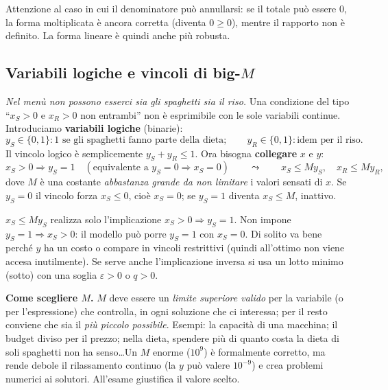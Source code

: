 \begin{oss}
Attenzione al caso in cui il denominatore può annullarsi: se il totale può essere 0, la forma moltiplicata è ancora corretta (diventa $0\ge0$), mentre il rapporto non è definito. La forma lineare è quindi anche più robusta.
\end{oss}

\subsection{Variabili logiche e vincoli di big-\texorpdfstring{$M$}{M}}\label{sec:bigM}

\emph{Nel menù non possono esserci sia gli spaghetti sia il riso.} Una condizione del tipo ``$x_S>0$ e $x_R>0$ non entrambi'' non è esprimibile con le sole variabili continue. Introduciamo \textbf{variabili logiche} (binarie):
\[ y_S\in\{0,1\}: 1 \text{ se gli spaghetti fanno parte della dieta};\qquad y_R\in\{0,1\}: \text{idem per il riso.}\]
Il vincolo logico è semplicemente $y_S+y_R\le 1$. Ora bisogna \textbf{collegare} $x$ e $y$:
\[ x_S>0\Rightarrow y_S=1\quad(\text{equivalente a } y_S=0\Rightarrow x_S=0)\qquad\leadsto\qquad x_S\le M y_S,\quad x_R\le M y_R, \]
dove $M$ è una costante \emph{abbastanza grande da non limitare} i valori sensati di $x$. Se $y_S=0$ il vincolo forza $x_S\le0$, cioè $x_S=0$; se $y_S=1$ diventa $x_S\le M$, inattivo.

\begin{oss}
$x_S\le My_S$ realizza solo l'implicazione $x_S>0\Rightarrow y_S=1$. Non impone $y_S=1\Rightarrow x_S>0$: il modello può porre $y_S=1$ con $x_S=0$. Di solito va bene perché $y$ ha un costo o compare in vincoli restrittivi (quindi all'ottimo non viene accesa inutilmente). Se serve anche l'implicazione inversa si usa un lotto minimo (sotto) con una soglia $\varepsilon>0$ o $q>0$.
\end{oss}

\begin{esame}
\textbf{Come scegliere $M$.} $M$ deve essere un \emph{limite superiore valido} per la variabile (o per l'espressione) che controlla, in ogni soluzione che ci interessa; per il resto conviene che sia il \emph{più piccolo possibile}. Esempi: la capacità di una macchina; il budget diviso per il prezzo; nella dieta, spendere più di quanto costa la dieta di soli spaghetti non ha senso\ldots Un $M$ enorme ($10^9$) è formalmente corretto, ma rende debole il rilassamento continuo (la $y$ può valere $10^{-9}$) e crea problemi numerici ai solutori. All'esame giustifica il valore scelto.
\end{esame}

